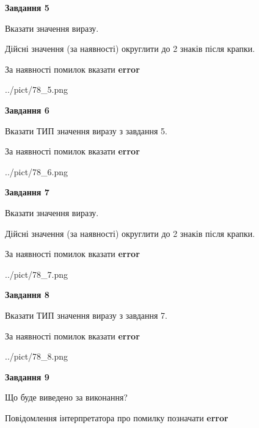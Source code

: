 \documentclass[11pt, ukrainian]{article}
\begin{document}
{\begin {large}
{\begin {center}\textbf{Завдання 5}\end {center}}\par
Вказати значення виразу. \par
Дійсні значення (за наявності) округлити до 2 знаків після крапки. \par
За наявності помилок вказати \textbf{error}

\begin{center}
	{../pict/78_5.png}
\end{center}
\newpage

{\begin {center}\textbf{Завдання 6}\end {center}}\par
Вказати ТИП значення виразу з завдання 5. \par
За наявності помилок вказати \textbf{error}

\begin{center}
	{../pict/78_6.png}
\end{center}
\newpage

{\begin {center}\textbf{Завдання 7}\end {center}}\par
Вказати значення виразу. \par
Дійсні значення (за наявності) округлити до 2 знаків після крапки. \par
За наявності помилок вказати \textbf{error}

\begin{center}
	{../pict/78_7.png}
\end{center}
\newpage

{\begin {center}\textbf{Завдання 8}\end {center}}\par
Вказати ТИП значення виразу з завдання 7. \par
За наявності помилок вказати \textbf{error}

\begin{center}
	{../pict/78_8.png}
\end{center}
\newpage

{\begin {center}\textbf{Завдання 9}\end {center}}\par
Що буде виведено за виконання? \par
Повідомлення інтерпретатора про помилку позначати \textbf{error}


\end{large}}
\end{document}
